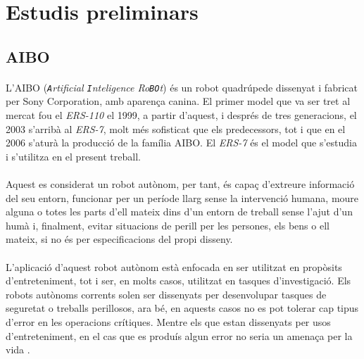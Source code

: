 \documentclass[12pt,a4paper,final,twoside]{article}
\begin{document}
\newpage

\label{Estudis-preliminars}
\section{Estudis preliminars}

\label{AIBO}
\subsection{AIBO}
\paragraph{}L'AIBO (\textit{\texttt{A}rtificial \texttt{I}nteligence Ro\texttt{BO}t}) és un robot quadrúpede dissenyat i fabricat per Sony Corporation, amb aparença canina. El primer model que va ser tret al mercat fou el \textit{ERS-110} el 1999, a partir d'aquest, i després de tres generacions, el 2003 s'arribà al \textit{ERS-7}, molt més sofisticat que els predecessors, tot i que en el 2006 s'aturà la producció de la família AIBO. El \textit{ERS-7} és el model que s'estudia i s'utilitza en el present treball.

\paragraph{}Aquest es considerat un robot autònom, per tant, és capaç d'extreure informació del seu entorn, funcionar per un període llarg sense la intervenció humana, moure alguna o totes les parts d'ell mateix dins d'un entorn de treball sense l'ajut d'un humà i, finalment, evitar situacions de perill per les persones, els bens o ell mateix, si no és per especificacions del propi disseny.

\paragraph{}L'aplicació d'aquest robot autònom està enfocada en ser utilitzat en propòsits d'entreteniment, tot i ser, en molts casos, utilitzat en tasques d'investigació. Els robots autònoms corrents solen ser dissenyats per desenvolupar tasques de seguretat o treballs perillosos, ara bé, en aquests casos no es pot tolerar cap tipus d'error en les operacions crítiques. Mentre els que estan dissenyats per usos d'entreteniment, en el cas que es produís algun error no seria un amenaça per la vida \cite{Fujita2000}.
\end{document}

